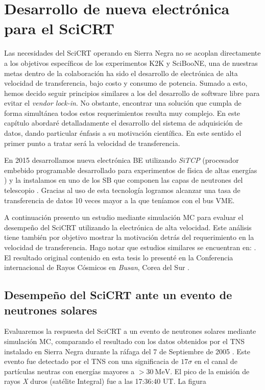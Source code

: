 
\chapter{Desarrollo de nueva electrónica para el SciCRT}
\label{chap:tres}

Las necesidades del SciCRT operando en Sierra Negra no se acoplan directamente a los objetivos específicos de los experimentos K2K y SciBooNE, una de nuestras metas dentro de la colaboración ha sido el desarrollo de electrónica de alta velocidad de transferencia, bajo costo y consumo de potencia. Sumado a esto, hemos decido seguir principios similares a los del desarrollo de software libre para evitar el \emph{vendor lock-in}. No obstante, encontrar una solución que cumpla de forma simultánea todos estos requerimientos resulta muy complejo. En este capítulo abordaré detalladamente el desarrollo del sistema de adquisición de datos, dando particular énfasis a su motivación científica. En este sentido el primer punto a tratar será la velocidad de transferencia.

En \num{2015} desarrollamos nueva electrónica BE utilizando \emph{SiTCP} (procesador embebido programable desarrollado para experimentos de física de altas energías \cite{uchida08}) y la instalamos en uno de los SB que componen las capas de neutrones del telescopio \cite{ysasai17}. Gracias al uso de esta tecnología logramos alcanzar una tasa de transferencia de datos \num{10} veces mayor a la que teníamos con el bus VME.

A continuación presento un estudio mediante simulación MC para evaluar el desempeño del SciCRT utilizando la electrónica de alta velocidad. Este análisis tiene también por objetivo mostrar la motivación detrás del requerimiento en la velocidad de transferencia. Hago notar que estudios similares se encuentran en: \cite{ynagai14,ysasai17}. El resultado original contenido en esta tesis lo presenté en la Conferencia internacional de Rayos Cósmicos en \emph{Busan}, Corea del Sur \cite{manzorena171}.

\section{Desempeño del SciCRT ante un evento de neutrones solares}

Evaluaremos la respuesta del SciCRT a un evento de neutrones solares mediante simulación MC, comparando el resultado con los datos obtenidos por el TNS instalado en Sierra Negra durante la ráfaga del \num{7} de Septiembre de \num{2005} \cite{sako06}. Este evento fue detectado por el TNS con una significacia de $17\sigma$ en el canal de partículas neutras con energías mayores a $>\SI{30}{\mega\electronvolt}$. El pico de la emisión de rayos \emph{X} duros (satélite Integral) fue a las 17:36:40 UT. La figura

